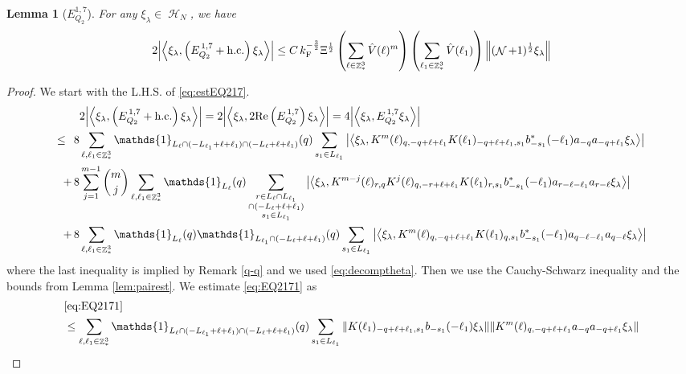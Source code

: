 \documentclass[12pt,a4paper]{article}
\numberwithin{equation}{section}
\newcommand{\1}{\mathbb{I}}
\newcommand{\F}{\mathrm{F}}
\DeclareMathOperator{\Z}{\mathbb{Z}}
\DeclareMathOperator{\HH}{\mathcal{H}}
\DeclareMathOperator{\NN}{\mathcal{N}}
\newcommand{\half}{\frac{1}{2}}
\newcommand{\eva}[1]{\left\langle #1 \right\rangle}
\theoremstyle{plain}
\newtheorem{lemma}[theorem]{Lemma}
\theoremstyle{definition}
\theoremstyle{remark}
\theoremstyle{plain}
\theoremstyle{definition}
\theoremstyle{remark}
\begin{document}
\begin{lemma}[$E_{Q_2}^{1,7}$]\label{lem:EQ217}
	For any $\xi_\lambda \in \HH_N$, we have
	\begin{align}
		2\abs{\eva{\xi_\lambda,\left(E^{\,1,7}_{Q_2}+\mathrm{h.c.}\right) \xi_\lambda }}
		\leq C\, k_{\F}^{-\frac{3}{2}} \Xi^{\half} \left(\sum\limits_{\ell\in \Z^3_*} \hat{V}(\ell)^m \right) \left(\sum\limits_{\ell_1\in \Z^3_*} \hat{V}(\ell_1) \right) \norm{(\NN+1)^\half \xi_\lambda } \label{eq:estEQ217}
	\end{align}
\end{lemma}
\begin{proof}
 We start with the L.H.S. of \eqref{eq:estEQ217}.
\begin{align}
	&2\abs{\eva{\xi_\lambda,\left(E^{\,1,7}_{Q_2}+\mathrm{h.c.}\right) \xi_\lambda }} =2 \abs{\eva{\xi_\lambda,2\mathrm{Re}\left(E^{\,1,7}_{Q_2}\right) \xi_\lambda }} = 4\abs{\eva{\xi_\lambda, E^{\,1,7}_{Q_2} \xi_\lambda }}\nonumber\\
	\leq\,\;8& \sum\limits_{\ell, \ell_1\in \Z^3_*} \mathds{1}_{L_{\ell} \cap (-L_{\ell_1}+\ell+\ell_1) \cap (-L_{\ell}+\ell+\ell_1)}(q) \sum\limits_{s_1 \in L_{\ell_1}} \abs{\eva{\xi_\lambda, K^m(\ell)_{q,-q+\ell+\ell_1} K(\ell_1)_{-q+\ell+\ell_1,s_1} b^*_{-s_1}(-\ell_1) a_{-q} a_{-q+\ell_1} \xi_\lambda}} \label{eq:EQ2171}\\
	+\,8& \sum\limits_{j=1}^{m-1} {{m}\choose j} \sum\limits_{\ell, \ell_1\in \Z^3_*}\mathds{1}_{L_{\ell}}(q) \sum\limits_{\substack{r\in L_{\ell} \cap L_{\ell_1} \\ \cap (-L_{\ell}+\ell+\ell_1)\\s_1\in L_{\ell_1}}}  \abs{\eva{\xi_\lambda, K^{m-j}(\ell)_{r,q} K^j(\ell)_{q,-r+\ell+\ell_1} K(\ell_1)_{r,s_1} b^*_{-s_1}(-\ell_1)a_{r-\ell-\ell_1}a_{r-\ell} \xi_\lambda }} \label{eq:EQ2172}\\
	+\,8&\sum\limits_{\ell, \ell_1\in \Z^3_*} \mathds{1}_{L_{\ell}}(q) \mathds{1}_{L_{\ell_1}\cap (-L_{\ell}+\ell+\ell_1)}(q) \sum\limits_{s_1\in L_{\ell_1}} \abs{\eva{\xi_\lambda, K^m(\ell)_{q,-q+\ell+\ell_1} K(\ell_1)_{q,s_1} b^*_{-s_1}(-\ell_1)a_{q-\ell-\ell_1}a_{q-\ell} \xi_\lambda }} \label{eq:EQ2173}
\end{align}
where the last inequality is implied by Remark \ref{q-q} and we used \eqref{eq:decomptheta}.
Then we use the Cauchy-Schwarz inequality and the bounds from Lemma \ref{lem:pairest}.
We estimate \eqref{eq:EQ2171} as 
\begin{align}
	&\eqref{eq:EQ2171}\nonumber\\
	&\leq \sum\limits_{\ell, \ell_1\in \Z^3_*} \mathds{1}_{L_{\ell} \cap (-L_{\ell_1}+\ell+\ell_1) \cap (-L_{\ell}+\ell+\ell_1)}(q) \sum\limits_{s_1 \in L_{\ell_1}} \norm{  K(\ell_1)_{-q+\ell+\ell_1,s_1} b_{-s_1}(-\ell_1) \xi_\lambda}\norm{ K^m(\ell)_{q,-q+\ell+\ell_1}a_{-q}a_{-q+\ell_1} \xi_\lambda }\nonumber\\

\end{align}
\end{proof}
\end{document}
